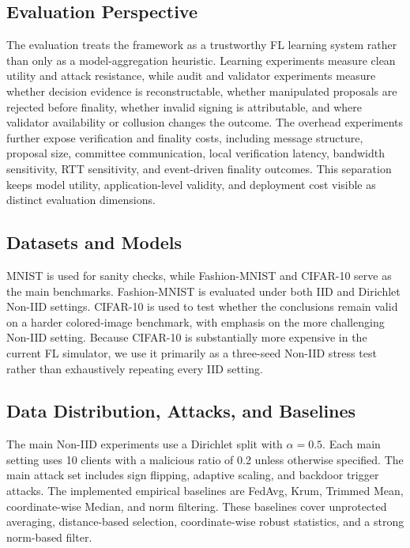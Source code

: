 \documentclass[preprint,12pt]{elsarticle}
\begin{document}
\subsection{Evaluation Perspective}

The evaluation treats the framework as a trustworthy FL learning system rather than only as a model-aggregation heuristic. Learning experiments measure clean utility and attack resistance, while audit and validator experiments measure whether decision evidence is reconstructable, whether manipulated proposals are rejected before finality, whether invalid signing is attributable, and where validator availability or collusion changes the outcome. The overhead experiments further expose verification and finality costs, including message structure, proposal size, committee communication, local verification latency, bandwidth sensitivity, RTT sensitivity, and event-driven finality outcomes. This separation keeps model utility, application-level validity, and deployment cost visible as distinct evaluation dimensions.

\subsection{Datasets and Models}

MNIST is used for sanity checks, while Fashion-MNIST and CIFAR-10 serve as the main benchmarks. Fashion-MNIST is evaluated under both IID and Dirichlet Non-IID settings. CIFAR-10 is used to test whether the conclusions remain valid on a harder colored-image benchmark, with emphasis on the more challenging Non-IID setting. Because CIFAR-10 is substantially more expensive in the current FL simulator, we use it primarily as a three-seed Non-IID stress test rather than exhaustively repeating every IID setting.

\subsection{Data Distribution, Attacks, and Baselines}

The main Non-IID experiments use a Dirichlet split with $\alpha=0.5$. Each main setting uses 10 clients with a malicious ratio of 0.2 unless otherwise specified. The main attack set includes sign flipping, adaptive scaling, and backdoor trigger attacks. The implemented empirical baselines are FedAvg, Krum, Trimmed Mean, coordinate-wise Median, and norm filtering. These baselines cover unprotected averaging, distance-based selection, coordinate-wise robust statistics, and a strong norm-based filter.
\end{document}
